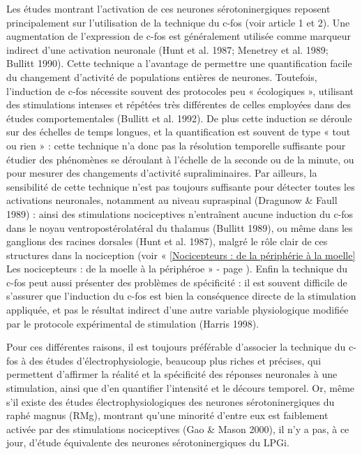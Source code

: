 \documentclass[a4paper,12pt,twoside]{report}
\begin{document}
Les études montrant l’activation de ces neurones sérotoninergiques reposent principalement sur l’utilisation de la technique du c-fos (voir article 1 et 2). Une augmentation de l’expression de c-fos est généralement utilisée comme marqueur indirect d’une activation neuronale (Hunt et al. 1987; Menetrey et al. 1989; Bullitt 1990). Cette technique a l’avantage de permettre une quantification facile du changement d’activité de populations entières de neurones. Toutefois, l’induction de c-fos nécessite souvent des protocoles peu « écologiques », utilisant des stimulations intenses et répétées très différentes de celles employées dans des études comportementales (Bullitt et al. 1992). De plus cette induction se déroule sur des échelles de temps longues, et la quantification est souvent de type « tout ou rien » : cette technique n’a donc pas la résolution temporelle suffisante pour étudier des phénomènes se déroulant à l’échelle de la seconde ou de la minute, ou pour mesurer des changements d’activité supraliminaires. Par ailleurs, la sensibilité de cette technique n’est pas toujours suffisante pour détecter toutes les activations neuronales, notamment au niveau supraspinal (Dragunow \& Faull 1989) : ainsi des stimulations nociceptives n’entraînent aucune induction du c-fos dans le noyau ventropostérolatéral du thalamus (Bullitt 1989), ou même dans les ganglions des racines dorsales (Hunt et al. 1987), malgré le rôle clair de ces structures dans la nociception (voir « \ref{Nocicepteurs : de la périphérie à la moelle} Les nocicepteurs : de la moelle à la périphéroe » - page \pageref{Nocicepteurs : de la périphérie à la moelle}). Enfin la technique du c-fos peut aussi présenter des problèmes de spécificité : il est souvent difficile de s’assurer que l’induction du c-fos est bien la conséquence directe de la stimulation appliquée, et pas le résultat indirect d’une autre variable physiologique modifiée par le protocole expérimental de stimulation (Harris 1998).

Pour ces différentes raisons, il est toujours préférable d’associer la technique du c-fos à des études d’électrophysiologie, beaucoup plus riches et précises, qui permettent d’affirmer la réalité et la spécificité des réponses neuronales à une stimulation, ainsi que d’en quantifier l’intensité et le décours temporel. Or, même s’il existe des études électrophysiologiques des neurones sérotoninergiques du raphé magnus (RMg), montrant qu’une minorité d’entre eux est faiblement activée par des stimulations nociceptives (Gao \& Mason 2000), il n’y a pas, à ce jour, d’étude équivalente des neurones sérotoninergiques du LPGi.
\end{document}
